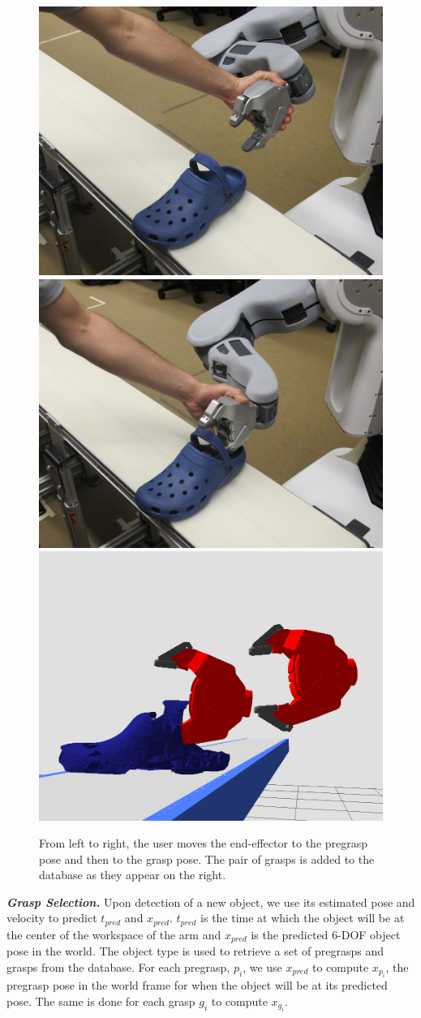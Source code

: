 \documentclass[letterpaper, 10 pt, conference]{ieeeconf}  %
\begin{document}
\begin{figure}[t]
\centering
\includegraphics[width=0.31\columnwidth]{figures/croc-record_pregrasp.jpg}
\includegraphics[width=0.31\columnwidth]{figures/croc-record_grasp.jpg}
\includegraphics[width=0.31\columnwidth]{figures/croc-grasps-outside_view.png}
\caption{
From left to right, the user moves the end-effector to the pregrasp pose and then to the grasp pose. The pair of grasps is added to the database as they appear on the right.
}
\label{fig:recording_grasps-photo}
\end{figure}

\textit{\textbf{Grasp Selection.}}  Upon detection of a new object, we
use its estimated pose and velocity to predict $t_{pred}$ and
$x_{pred}$. $t_{pred}$ is the time at which the object will be at the
center of the workspace of the arm and $x_{pred}$ is the predicted
6-DOF object pose in the world. The object type is used to retrieve a
set of pregrasps and grasps from the database. For each pregrasp,
$p_i$, we use $x_{pred}$ to compute $x_{p_i}$, the pregrasp pose in
the world frame for when the object will be at its predicted pose. The
same is done for each grasp $g_i$ to compute $x_{g_i}$.
\end{document}
